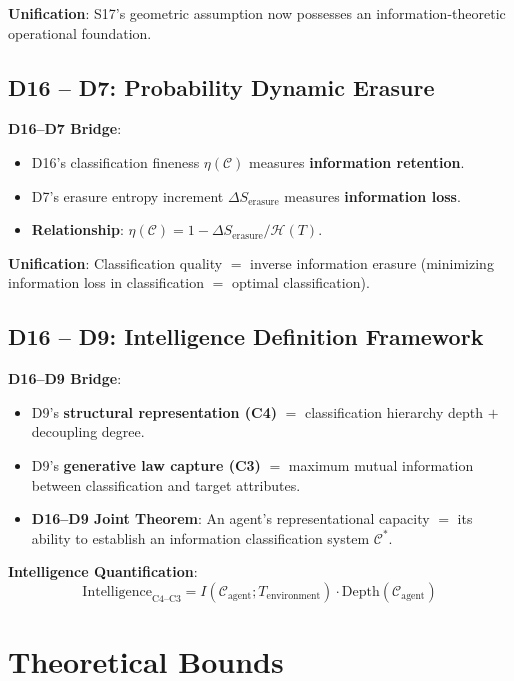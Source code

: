 \documentclass[12pt, a4paper]{article}
\begin{document}
\textbf{Unification}: S17's geometric assumption now possesses an information-theoretic operational foundation.

\subsection{D16 -- D7: Probability Dynamic Erasure}

\textbf{D16--D7 Bridge}:
\begin{itemize}
    \item D16's classification fineness $\eta(\mathcal{C})$ measures \textbf{information retention}.
    \item D7's erasure entropy increment $\Delta S_{\mathrm{erasure}}$ measures \textbf{information loss}.
    \item \textbf{Relationship}: $\eta(\mathcal{C}) = 1 - \Delta S_{\mathrm{erasure}} / \mathcal{H}(T)$.
\end{itemize}

\textbf{Unification}: Classification quality $=$ inverse information erasure (minimizing information loss in classification $=$ optimal classification).

\subsection{D16 -- D9: Intelligence Definition Framework}

\textbf{D16--D9 Bridge}:
\begin{itemize}
    \item D9's \textbf{structural representation (C4)} $=$ classification hierarchy depth $+$ decoupling degree.
    \item D9's \textbf{generative law capture (C3)} $=$ maximum mutual information between classification and target attributes.
    \item \textbf{D16--D9 Joint Theorem}: An agent's representational capacity $=$ its ability to establish an information classification system $\mathcal{C}^*$.
\end{itemize}

\textbf{Intelligence Quantification}:
\[
\mathrm{Intelligence}_{\mathrm{C4\text{--}C3}} = I(\mathcal{C}_{\mathrm{agent}}; T_{\mathrm{environment}}) \cdot \mathrm{Depth}(\mathcal{C}_{\mathrm{agent}})
\]

\section{Theoretical Bounds}
\end{document}
